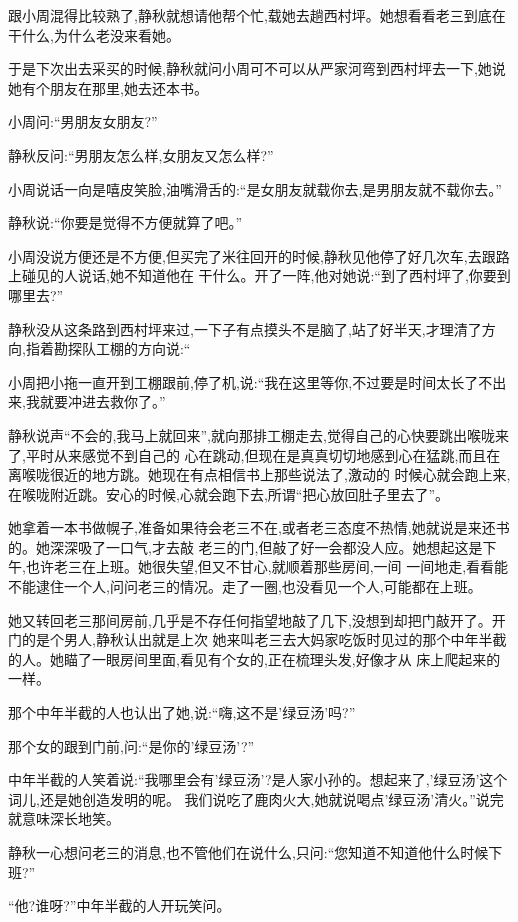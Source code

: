 ﻿\documentclass[12pt]{article}
\begin{document}
跟小周混得比较熟了,静秋就想请他帮个忙,载她去趟西村坪。她想看看老三到底在干什么,为什么老没来看她。

于是下次出去采买的时候,静秋就问小周可不可以从严家河弯到西村坪去一下,她说她有个朋友在那里,她去还本书。

小周问:``男朋友女朋友?''

静秋反问:``男朋友怎么样,女朋友又怎么样?''


小周说话一向是嘻皮笑脸,油嘴滑舌的:``是女朋友就载你去,是男朋友就不载你去。''

静秋说:``你要是觉得不方便就算了吧。''

小周没说方便还是不方便,但买完了米往回开的时候,静秋见他停了好几次车,去跟路上碰见的人说话,她不知道他在
干什么。开了一阵,他对她说:``到了西村坪了,你要到哪里去?''

静秋没从这条路到西村坪来过,一下子有点摸头不是脑了,站了好半天,才理清了方向,指着勘探队工棚的方向说:``

小周把小拖一直开到工棚跟前,停了机,说:``我在这里等你,不过要是时间太长了不出来,我就要冲进去救你了。''

静秋说声``不会的,我马上就回来'',就向那排工棚走去,觉得自己的心快要跳出喉咙来了,平时从来感觉不到自己的
心在跳动,但现在是真真切切地感到心在猛跳,而且在离喉咙很近的地方跳。她现在有点相信书上那些说法了,激动的
时候心就会跑上来,在喉咙附近跳。安心的时候,心就会跑下去,所谓``把心放回肚子里去了''。

她拿着一本书做幌子,准备如果待会老三不在,或者老三态度不热情,她就说是来还书的。她深深吸了一口气,才去敲
老三的门,但敲了好一会都没人应。她想起这是下午,也许老三在上班。她很失望,但又不甘心,就顺着那些房间,一间
一间地走,看看能不能逮住一个人,问问老三的情况。走了一圈,也没看见一个人,可能都在上班。

她又转回老三那间房前,几乎是不存任何指望地敲了几下,没想到却把门敲开了。开门的是个男人,静秋认出就是上次
她来叫老三去大妈家吃饭时见过的那个中年半截的人。她瞄了一眼房间里面,看见有个女的,正在梳理头发,好像才从
床上爬起来的一样。

那个中年半截的人也认出了她,说:``嗨,这不是'绿豆汤'吗?''

那个女的跟到门前,问:``是你的'绿豆汤'?''

中年半截的人笑着说:``我哪里会有'绿豆汤'?是人家小孙的。想起来了,'绿豆汤'这个词儿,还是她创造发明的呢。
我们说吃了鹿肉火大,她就说喝点'绿豆汤'清火。''说完就意味深长地笑。

静秋一心想问老三的消息,也不管他们在说什么,只问:``您知道不知道\myrule 他什么时候下班?''

``他?谁呀?''中年半截的人开玩笑问。
\end{document}
